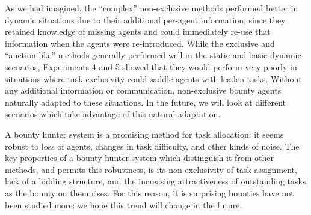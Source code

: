 \documentclass[letterpaper]{aamas2015}
\begin{document}
As we had imagined, the ``complex'' non-exclusive methods performed better in dynamic situations due to their additional per-agent information, since they retained knowledge of missing agents and could immediately re-use that information when the agents were re-introduced.    While the exclusive and ``auction-like'' methods generally performed well in the static and basic dynamic scenarios, Experiments 4 and 5 showed that they would perform very poorly in situations where task exclusivity could saddle agents with leaden tasks.  Without any additional information or communication, non-exclusive bounty agents naturally adapted to these situations. In the future, we will look at different scenarios which take advantage of this natural adaptation.  

A bounty hunter system is a promising method for task allocation: it seems robust to loss of agents, changes in task difficulty, and other kinds of noise.  The key properties of a bounty hunter system which distinguish it from other methods, and permits this robustness, is its non-exclusivity of task assignment, lack of a bidding structure, and the increasing attractiveness of outstanding tasks as the bounty on them rises.  For this reason, it is surprising bounties have not been studied more: we hope this trend will change in the future.


\vspace{-0.5em}


\end{document}
